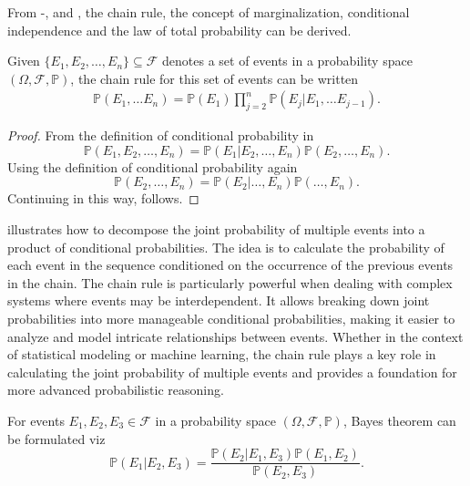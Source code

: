 From -,  and , the chain rule, the concept of marginalization, conditional independence and the law of total probability can be derived. 
\begin{theorem}
	\label{theorem:chain_rule}
	Given $\{E_1, E_2, \ldots, E_n\}\subseteq \mathcal{F}$ denotes a set of events in a probability space $(\Omega, \mathcal{F}, \mathbb{P})$, the chain rule for this set of events can be written
	\begin{equation}
		\begin{split}
			\mathbb{P}(E_1, \dots E_n) = \mathbb{P}(E_1)\prod_{j=2}^{n}\mathbb{P}(E_j|E_1,\dots E_{j-1}).
		\end{split}
		\label{eq:prod}
	\end{equation}
\end{theorem}
\begin{proof}
	From the definition of conditional probability in 
	\begin{equation}
		\mathbb{P}(E_1, E_2, \ldots, E_n) = \mathbb{P}(E_1|E_2, \dots, E_n)\mathbb{P}(E_2, \dots, E_n).
		\label{eq:p1}
	\end{equation}
	Using the definition of conditional probability again
	\begin{equation}
		\mathbb{P}(E_2, \ldots, E_n) = \mathbb{P}(E_2| \ldots, E_n)\mathbb{P}(\dots, E_n).
	\end{equation}
	Continuing in this way,  follows.
\end{proof}
\begin{remark}
	 illustrates how to decompose the joint probability of multiple events into a product of conditional probabilities. The idea is to calculate the probability of each event in the sequence conditioned on the occurrence of the previous events in the chain. The chain rule is particularly powerful when dealing with complex systems where events may be interdependent. It allows breaking down joint probabilities into more manageable conditional probabilities, making it easier to analyze and model intricate relationships between events. Whether in the context of statistical modeling or machine learning, the chain rule plays a key role in calculating the joint probability of multiple events and provides a foundation for more advanced probabilistic reasoning.
\end{remark}

\begin{theorem}
	\label{theorem:bayes_theorem}
	For events $E_1,E_2,E_3 \in \mathcal{F}$ in a probability space $(\Omega, \mathcal{F}, \mathbb{P})$, Bayes theorem can be formulated viz
	\begin{equation}
		\mathbb{P}(E_1| E_2,E_3) = \frac{\mathbb{P}(E_2| E_1,E_3)\mathbb{P}(E_1,E_2)}{\mathbb{P}(E_2,E_3)}.
		\label{bayes_theorem}
	\end{equation}
\end{theorem}

